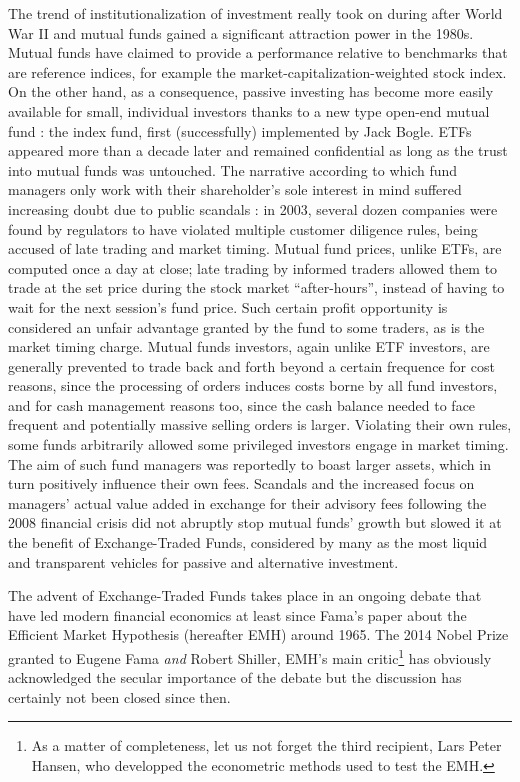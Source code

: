 The trend of institutionalization of investment really took on during after World War II and mutual funds gained a significant attraction power in the 1980s. Mutual funds have claimed to provide a performance relative to benchmarks that are reference indices, for example the market-capitalization-weighted stock index. On the other hand, as a consequence, passive investing has become more easily available for small, individual investors thanks to a new type open-end mutual fund : the index fund, first (successfully) implemented by Jack Bogle. ETFs appeared more than a decade later and remained confidential as long as the trust into mutual funds was untouched. The narrative according to which fund managers only work with their shareholder's sole interest in mind suffered increasing doubt due to public scandals : in 2003, several dozen companies were found by regulators to have violated multiple customer diligence rules, being accused of late trading and market timing. Mutual fund prices, unlike ETFs, are computed once a day at close; late trading by informed traders allowed them to trade at the set price during the stock market ``after-hours'', instead of having to wait for the next session's fund price. Such certain profit opportunity is considered an unfair advantage granted by the fund to some traders, as is the market timing charge. Mutual funds investors, again unlike ETF investors, are generally prevented to trade back and forth beyond a certain frequence for cost reasons, since the processing of orders induces costs borne by all fund investors, and for cash management reasons too, since the cash balance needed to face frequent and potentially massive selling orders is larger. Violating their own rules, some funds arbitrarily allowed some privileged investors engage in market timing. The aim of such fund managers was reportedly to boast larger assets, which in turn positively influence their own fees. Scandals and the increased focus on managers' actual value added in exchange for their advisory fees following the 2008 financial crisis did not abruptly stop mutual funds' growth but slowed it at the benefit of Exchange-Traded Funds, considered by many as the most liquid and transparent vehicles for passive and alternative investment.

The advent of Exchange-Traded Funds takes place in an ongoing debate that have led modern financial economics at least since Fama's paper about the Efficient Market Hypothesis (hereafter EMH) around 1965. The 2014 Nobel Prize granted to Eugene Fama \textit{and} Robert Shiller, EMH's main critic\footnote{As a matter of completeness, let us not forget the third recipient, Lars Peter Hansen, who developped the econometric methods used to test the EMH.} has obviously acknowledged the secular importance of the debate but the discussion has certainly not been closed since then.

